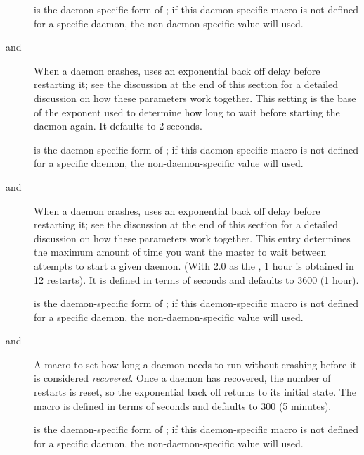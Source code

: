 \begin{description}
   is the daemon-specific
  form of ; if this daemon-specific
  macro is not defined for a specific daemon, the non-daemon-specific
  value will used.

\label{param:MasterBackoffFactor}
\item[\Macro{MASTER\_BACKOFF\_FACTOR} and
      \Macro{MASTER\_<name>\_BACKOFF\_FACTOR}]
  When a daemon crashes,  uses an exponential back off
  delay before restarting it; see the discussion at the end of this
  section for a detailed discussion on how these parameters work together.
  This setting is the base of the
  exponent used to determine how long to wait before starting the
  daemon again.  It defaults to 2 seconds.

   is the daemon-specific
  form of ; if this daemon-specific
  macro is not defined for a specific daemon, the non-daemon-specific
  value will used.

\label{param:MasterBackoffCeiling}
\item[\Macro{MASTER\_BACKOFF\_CEILING} and
      \Macro{MASTER\_<name>\_BACKOFF\_CEILING}]
  When a daemon crashes,  uses an exponential back off
  delay before restarting it; see the discussion at the end of this
  section for a detailed discussion on how these parameters work together.
  This entry determines the maximum amount of time you want the master
  to wait between attempts to start a given daemon.
  (With 2.0 as the ,
  1 hour is obtained in 12 restarts).  It is defined in terms of
  seconds and defaults to 3600 (1 hour).

   is the daemon-specific
  form of ; if this daemon-specific
  macro is not defined for a specific daemon, the non-daemon-specific
  value will used.

\label{param:MasterRecoverFactor}
\item[\Macro{MASTER\_RECOVER\_FACTOR} and
      \Macro{MASTER\_<name>\_RECOVER\_FACTOR}]
  A macro to set how long a daemon 
  needs to run without crashing before it is considered \emph{recovered}.
  Once a
  daemon has recovered, the number of restarts is reset, so the
  exponential back off returns to its initial state.  
  The macro is defined in
  terms of seconds and defaults to 300 (5 minutes).

   is the daemon-specific
  form of ; if this daemon-specific
  macro is not defined for a specific daemon, the non-daemon-specific
  value will used.

\end{description}

